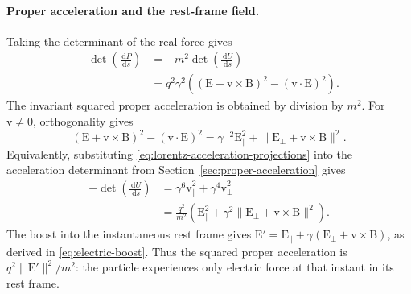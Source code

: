 \documentclass[11pt]{article}
\newcommand{\pv}[1]{{#1}}
\newcommand{\vstyle}[1]{{\bm{\mathrm{#1}}}}
\newcommand{\pP}{\pv{P}}
\newcommand{\pU}{\pv{U}}
\numberwithin{equation}{section}
\newcommand{\dotprod}{\cdot}
\newcommand{\bv}{\vstyle{v}}
\newcommand{\bE}{\vstyle{E}}
\newcommand{\bBf}{\vstyle{B}}
\newcommand{\dd}{\,\mathrm d}
\begin{document}
\paragraph{Proper acceleration and the rest-frame field.}
Taking the determinant of the real force gives
\begin{equation*}
 \begin{aligned}
 -\det\left(\frac{\dd \pP}{\dd s}\right)
 &=-m^2\det\left(\frac{\dd \pU}{\dd s}\right)\\
 &=q^2\gamma^2((\bE+\bv\times\bBf)^2-(\bv\dotprod\bE)^2).
 \end{aligned}
\end{equation*}
The invariant squared proper acceleration is obtained by division by $m^2$.
For $\bv\ne0$, orthogonality gives
\[
 (\bE+\bv\times\bBf)^2-(\bv\dotprod\bE)^2
 =\gamma^{-2}\bE_{\parallel}^2
  +\lVert\bE_{\perp}+\bv\times\bBf\rVert^2.
\]
Equivalently, substituting \eqref{eq:lorentz-acceleration-projections}
into the acceleration determinant from Section~\ref{sec:proper-acceleration}
gives
\begin{equation}
 \begin{aligned}
 -\det\left(\frac{\dd\pU}{\dd s}\right)
 &=\gamma^6\dot{\bv}_{\parallel}^2
   +\gamma^4\dot{\bv}_{\perp}^2\\
 &=\frac{q^2}{m^2}(\bE_{\parallel}^2
   +\gamma^2\lVert\bE_{\perp}+\bv\times\bBf\rVert^2).
 \end{aligned}
 \label{eq:lorentz-proper-acceleration-projections}
\end{equation}
The boost into the instantaneous rest frame gives
$\bE'=\bE_{\parallel}+\gamma(\bE_{\perp}+\bv\times\bBf)$,
as derived in \eqref{eq:electric-boost}. Thus the squared proper
acceleration is $q^2\lVert\bE'\rVert^2/m^2$: the particle experiences
only electric force at that instant in its rest frame.
\end{document}
